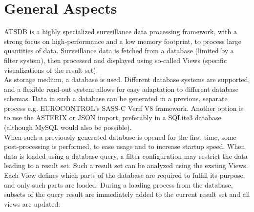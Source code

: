 \section{General Aspects}
ATSDB is a highly specialized surveillance data processing framework, with a strong focus on high-performance and a low memory footprint,  to process large quantities of data. Surveillance data is fetched from a database (limited by a filter system), then processed and displayed using so-called Views (specific visualizations of the result set).\\

As storage medium, a database is used.  Different database systems are supported, and a flexible read-out system allows for easy adaptation to different database schemas.  Data in such a database can be generated in a previous, separate process e.g. EUROCONTROL's SASS-C Verif V8 framework. Another option is to use the ASTERIX or JSON import, preferably in a SQLite3 database (although MySQL would also be possible).\\

When such a previously generated database is opened for the first time, some post-processing is performed, to ease usage and to increase startup speed.  When data is loaded using a database query, a filter configuration may restrict the data leading to a result set.  Such a result set can be analyzed using the exsting Views.\\

Each View defines which parts of the database are required to fulfill its purpose, and only such parts are loaded.  During a loading process from the database, subsets of the query result are immediately added to the current result set and all views are updated.  
